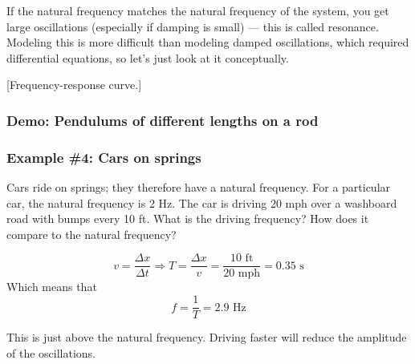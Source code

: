 If the natural frequency matches the natural frequency of the system, you get large oscillations (especially if damping is small) --- this is called resonance. Modeling this is more difficult than modeling damped oscillations, which required differential equations, so let's just look at it conceptually.

[Frequency-response curve.]\nopagebreak
\vspace{5cm}


\subsubsection{Demo: Pendulums of different lengths on a rod}


\subsubsection{Example \#4: Cars on springs}
Cars ride on springs; they therefore have a natural frequency. For a particular car, the natural frequency is 2 Hz. The car is driving 20 mph over a washboard road with bumps every 10 ft. What is the driving frequency? How does it compare to the natural frequency?

$$v=\frac{\Delta{x}}{\Delta{t}}\Rightarrow T=\frac{\Delta{x}}{v}=\frac{10\mbox{ ft}}{20\mbox{ mph}}=0.35\mbox{ s}$$
Which means that
$$f=\frac{1}{T}=2.9\mbox{ Hz}$$

This is just above the natural frequency. Driving faster will reduce the amplitude of the oscillations.


\clearpage
